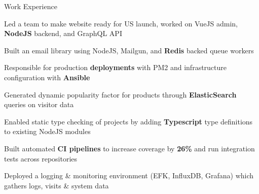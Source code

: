 \documentclass[UKenglish]{resume} %
\begin{document}
\begin{rSection}{Work Experience}
\begin{rSubsection}
        \item Led a team to make website ready for US launch, worked on VueJS admin, \textbf{NodeJS} backend, and GraphQL API
        \item Built an email library using NodeJS, Mailgun, and \textbf{Redis} backed queue workers
        \item Responsible for production \textbf{deployments} with PM2 and infrastructure configuration with \textbf{Ansible}
        \item Generated dynamic popularity factor for products through \textbf{ElasticSearch} queries on visitor data
        \item Enabled static type checking of projects by adding \textbf{Typescript} type definitions to existing NodeJS modules
        \item Built automated \textbf{CI pipelines} to increase coverage by \textbf{26\%} and run integration tests across repositories
        \item Deployed a logging \& monitoring environment (EFK, InfluxDB, Grafana) which gathers logs, visits \& system data

    \end{rSubsection}



\end{rSection}
\end{document}
